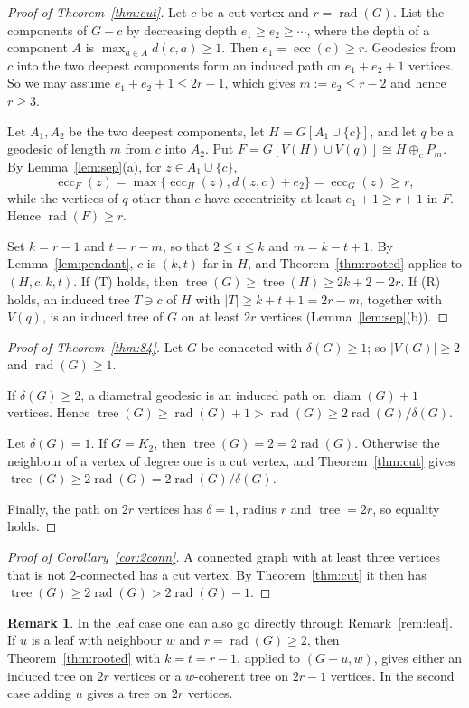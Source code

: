 \documentclass[11pt,a4paper]{article}
\theoremstyle{definition}
\newtheorem{remark}[theorem]{Remark}
\newcommand{\rad}{\operatorname{rad}}
\newcommand{\diam}{\operatorname{diam}}
\newcommand{\ecc}{\operatorname{ecc}}
\newcommand{\tr}{\operatorname{tree}}
\newcommand{\plus}{\oplus}
\begin{document}
\begin{proof}[Proof of Theorem~\ref{thm:cut}]
Let $c$ be a cut vertex and $r=\rad(G)$. List the components of $G-c$ by decreasing depth $e_1\ge e_2\ge\cdots$, where the depth of a component $A$ is $\max_{a\in A}d(c,a)\ge1$. Then $e_1=\ecc(c)\ge r$. Geodesics from $c$ into the two deepest components form an induced path on $e_1+e_2+1$ vertices. So we may assume $e_1+e_2+1\le 2r-1$, which gives $m:=e_2\le r-2$ and hence $r\ge3$.

Let $A_1,A_2$ be the two deepest components, let $H=G[A_1\cup\{c\}]$, and let $q$ be a geodesic of length $m$ from $c$ into $A_2$. Put $F=G[V(H)\cup V(q)]\cong H\plus_c P_m$. By Lemma~\ref{lem:sep}(a), for $z\in A_1\cup\{c\}$,
\[
\ecc_F(z)=\max\{\ecc_H(z),d(z,c)+e_2\}=\ecc_G(z)\ge r,
\]
while the vertices of $q$ other than $c$ have eccentricity at least $e_1+1\ge r+1$ in $F$. Hence $\rad(F)\ge r$.

Set $k=r-1$ and $t=r-m$, so that $2\le t\le k$ and $m=k-t+1$. By Lemma~\ref{lem:pendant}, $c$ is $(k,t)$-far in $H$, and Theorem~\ref{thm:rooted} applies to $(H,c,k,t)$. If (T) holds, then $\tr(G)\ge\tr(H)\ge 2k+2=2r$. If (R) holds, an induced tree $T\ni c$ of $H$ with $|T|\ge k+t+1=2r-m$, together with $V(q)$, is an induced tree of $G$ on at least $2r$ vertices (Lemma~\ref{lem:sep}(b)).
\end{proof}

\begin{proof}[Proof of Theorem~\ref{thm:84}]
Let $G$ be connected with $\delta(G)\ge1$; so $|V(G)|\ge2$ and $\rad(G)\ge1$.

If $\delta(G)\ge2$, a diametral geodesic is an induced path on $\diam(G)+1$ vertices. Hence $\tr(G)\ge\rad(G)+1>\rad(G)\ge 2\rad(G)/\delta(G)$.

Let $\delta(G)=1$. If $G=K_2$, then $\tr(G)=2=2\rad(G)$. Otherwise the neighbour of a vertex of degree one is a cut vertex, and Theorem~\ref{thm:cut} gives $\tr(G)\ge2\rad(G)=2\rad(G)/\delta(G)$.

Finally, the path on $2r$ vertices has $\delta=1$, radius $r$ and $\tr=2r$, so equality holds.
\end{proof}

\begin{proof}[Proof of Corollary~\ref{cor:2conn}]
A connected graph with at least three vertices that is not $2$-connected has a cut vertex. By Theorem~\ref{thm:cut} it then has $\tr(G)\ge2\rad(G)>2\rad(G)-1$.
\end{proof}

\begin{remark}
In the leaf case one can also go directly through Remark~\ref{rem:leaf}. If $u$ is a leaf with neighbour $w$ and $r=\rad(G)\ge2$, then Theorem~\ref{thm:rooted} with $k=t=r-1$, applied to $(G-u,w)$, gives either an induced tree on $2r$ vertices or a $w$-coherent tree on $2r-1$ vertices. In the second case adding $u$ gives a tree on $2r$ vertices.
\end{remark}
\end{document}
